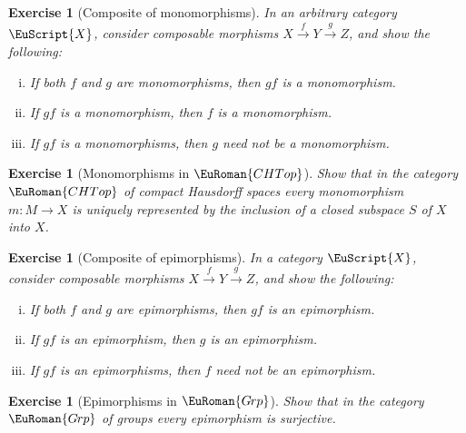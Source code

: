 \documentclass [12pt,oneside]{book}%
\theoremstyle{captionstyle}  %
\newtheorem{exercise}[theorem]{Exercise}
\newenvironment{thmlist}{		%
	\begin{enumerate}[(i)]}{
	\end{enumerate}
}
\newenvironment{exercises}{%
	\def\FrameCommand{{\color{Maroon}\vrule width 0pt}\hspace{0pt}\fboxsep=\FrameSep}%
	\MakeFramed{\hsize=0.95\linewidth\advance\hsize-\width\FrameRestore%
		\bigskip
		\textbf{Exercises}\vspace{-2ex}\footnotesize{
		}}
}
{\endMakeFramed}
\newcommand{\XRA}[1]{\xrightarrow{\ #1\ }}
\newcommand{\from}{\colon}				%
\newcommand{\Grps}{\EuRoman{G{\kern -.15ex}rp}}				%
\newcommand{\CHTops}{\EuRoman{CHTop}}						 %
\newcommand{\SACtgry}[1]{\EuScript{#1}}			%
\begin{document}
\begin{exercises}

\begin{exercise}[Composite of monomorphisms]
    \label{exe:Monomorphisms-Composite}
    \label{thm:Monomorphism-Properties}%
    \label{thm:Monomorphism-Composites}%
    In an arbitrary category $\SACtgry{X}$, consider composable morphisms $X\XRA{f} Y \XRA{g} Z$, and show the following:%
    \begin{thmlist}
        \item If both $f$ and $g$ are monomorphisms, then $gf$ is a monomorphism.
        \item If $gf$ is a monomorphism, then $f$ is a monomorphism.
        \item If $gf$ is a monomorphisms, then $g$ need not be a monomorphism.
    \end{thmlist}
\end{exercise}

\begin{exercise}[Monomorphisms in $\CHTops$]
    \label{exe:Monomorphis-CHTop}
    Show that in the category $\CHTops$ of compact Hausdorff spaces every monomorphism $m\from M\to X$ is uniquely represented by the inclusion of a closed subspace $S$ of $X$ into $X$.
\end{exercise}

\begin{exercise}[Composite of epimorphisms]
    \label{exe:Epimorphisms-Composite}
    In a category $\SACtgry{X}$, consider composable morphisms $X\XRA{f} Y \XRA{g} Z$, and show the following:%
    \begin{thmlist}
        \item If both $f$ and $g$ are epimorphisms, then $gf$ is an epimorphism.
        \item If $gf$ is an epimorphism, then $g$ is an epimorphism.
        \item If $gf$ is an epimorphisms, then $f$ need not be an epimorphism.
    \end{thmlist}
\end{exercise}

\begin{exercise}[Epimorphisms in $\Grps$]
    \label{exe:Epimorphisms-In-Grps}
    \cite[p.~21]{SMacLane1998}\quad Show that in the category $\Grps$ of groups every epimorphism is surjective.
\end{exercise}


\end{exercises}
\end{document}

